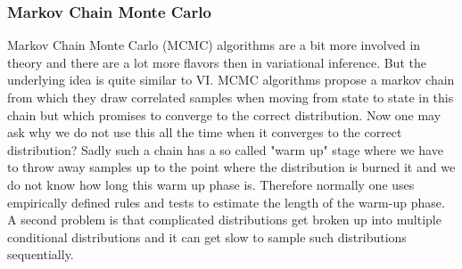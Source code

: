 \documentclass[10pt,conference,compsocconf]{IEEEtran}
\begin{document}
\subsubsection{Markov Chain Monte Carlo}
Markov Chain Monte Carlo (MCMC) algorithms are a bit more involved in theory and there are a lot more flavors then in variational inference. But the underlying idea is quite similar to VI. MCMC algorithms propose a markov chain from which they draw correlated samples when moving from state to state in this chain but which promises to converge to the correct distribution. Now one may ask why we do not use this all the time when it converges to the correct distribution? Sadly such a chain has a so called "warm up" stage where we have to throw away samples up to the point where the distribution is burned it and we do not know how long this warm up phase is. Therefore normally one uses empirically defined rules and tests to estimate the length of the warm-up phase. A second problem is that complicated distributions get broken up into multiple conditional distributions and it can get slow to sample such distributions sequentially. \\
\end{document}
